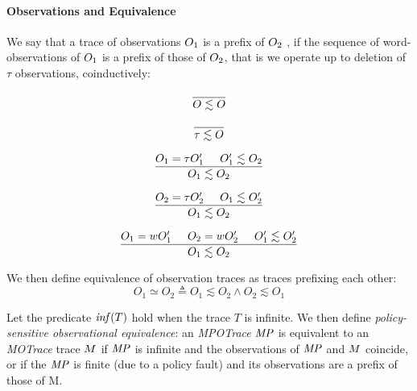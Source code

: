 \documentclass[acmsmall,review,anonymous]{acmart}\settopmatter{printfolios=true,printccs=false,printacmref=false}
\begin{document}
\paragraph*{Observations and Equivalence}

We say that a trace of observations $O_1$ is a prefix of $O_2$
, if the
sequence of word-observations of $O_1$ is a prefix of those of
$O_2$, that is we operate up to deletion of \(\tau\) observations, coinductively:

\[\frac{} {O \lesssim O}\]

\[\frac{} {\tau \lesssim O}\]

\[\frac{O_1 = \tau O_1' \hspace{.5cm} O_1' \lesssim O_2}
       {O_1 \lesssim O_2}\]

\[\frac{O_2 = \tau O_2' \hspace{.5cm} O_1 \lesssim O_2'}
       {O_1 \lesssim O_2}\]

\[\frac{O_1 = w O_1' \hspace{.5cm} O_2 = w O_2' \hspace{.5cm} O_1' \lesssim O_2'}
       {O_1 \lesssim O_2}\]

    
We then define equivalence of observation traces as traces prefixing each other:
\[O_1 \simeq O_2 \triangleq O_1 \lesssim O_2 \land O_2 \lesssim O_1\]



Let the predicate \(\mathit{inf}(T)\) hold when the trace $T$ is infinite.
We then define {\em policy-sensitive observational equivalence}: an
{\it MPOTrace} \(\mathit{MP}\) is equivalent to an {\it MOTrace} trace \(M\) if \(\mathit{MP}\)
is infinite and the observations of \(\mathit{MP}\) and \(M\) coincide, or if the \(\mathit{MP}\)
is finite (due to a policy fault) and its observations are a prefix of those of M.
\end{document}
